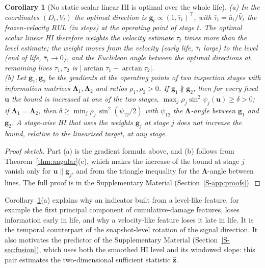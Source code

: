 \documentclass[preprint,12pt]{elsarticle}
\newtheorem{corollary}{Corollary}
\theoremstyle{definition}
\begin{document}
\begin{corollary}[No static scalar linear HI is optimal over the whole life]
\label{cor:rotation}
(a) In the coordinates $(D_t,V_t)$ the optimal direction is $\mathbf g_t\propto(1,\bar\tau_t)^\top$, with $\bar\tau_t=\bar a_t/\bar V_t$ the frozen-velocity RUL (in steps) at the operating point of stage $t$. The optimal scalar linear HI therefore weights the velocity estimate $\bar\tau_t$ times more than the level estimate; the weight moves from the velocity (early life, $\bar\tau_t$ large) to the level (end of life, $\bar\tau_t\to0$), and the Euclidean angle between the optimal directions at remaining lives $\tau_1,\tau_2$ is $|\arctan\tau_1-\arctan\tau_2|$.\\
(b) Let $\mathbf g_1,\mathbf g_2$ be the gradients at the operating points of two inspection stages with information matrices $\boldsymbol\Lambda_1,\boldsymbol\Lambda_2$ and ratios $\rho_1,\rho_2>0$. If $\mathbf g_1\not\parallel\mathbf g_2$, then for every fixed $\mathbf u$ the bound is increased at one of the two stages, $\max_j\rho_j\sin^2\psi_j(\mathbf u)\ge\delta>0$; if $\boldsymbol\Lambda_1=\boldsymbol\Lambda_2$, then $\delta\ge\min_j\rho_j\,\sin^2(\psi_{12}/2)$ with $\psi_{12}$ the $\boldsymbol\Lambda$-angle between $\mathbf g_1$ and $\mathbf g_2$. A stage-wise HI that uses the weights $\mathbf g_j$ at stage $j$ does not increase the bound, relative to the linearised target, at any stage.
\end{corollary}
\begin{proof}[Proof sketch]
Part (a) is the gradient formula above, and (b) follows from Theorem~\ref{thm:angular}(c), which makes the increase of the bound at stage $j$ vanish only for $\mathbf u\parallel\mathbf g_j$, and from the triangle inequality for the $\boldsymbol\Lambda$-angle between lines. The full proof is in the Supplementary Material (Section~\ref{S-app:proofs}).
\end{proof}
Corollary~\ref{cor:rotation}(a) explains why an indicator built from a level-like feature, for example the first principal component of cumulative-damage features, loses information early in life, and why a velocity-like feature loses it late in life. It is the temporal counterpart of the snapshot-level rotation of the signal direction. It also motivates the predictor of the Supplementary Material (Section~\ref{S-sec:fusion}), which uses both the smoothed HI level and its windowed slope: this pair estimates the two-dimensional sufficient statistic $\hat{\mathbf z}$.
\end{document}
